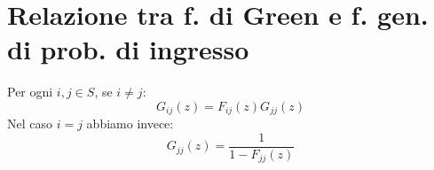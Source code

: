 \documentclass[\main/main.tex]{subfiles}
\begin{document}
\section{Relazione tra f. di Green e f. gen. di prob. di ingresso}
\begin{theorem}
  Per ogni \(i, j \in S\), se \(i\neq j\):
  \[
    G_{ij}(z) = F_{ij}(z) G_{jj}(z)
  \]
  Nel caso \(i=j\) abbiamo invece:
  \[
    G_{jj}(z) = \frac{1}{1 - F_{jj}(z)}
  \]
\end{theorem}
\end{document}
